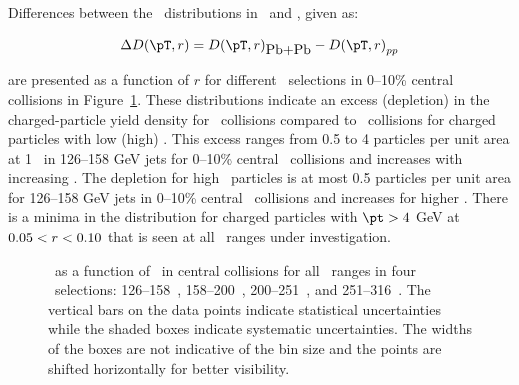 Differences between the \Dptr\ distributions in \pbpb\ and \pp, given as:

\begin{align}
\DeltaDptr = \Dptr_{\pbpb} - \Dptr_{pp}
\end{align}

are presented as a function of $r$ for different \pt\ selections in 0--10\% central collisions in Figure~\ref{fig:deltadptr}. 
These distributions indicate an excess (depletion) in the charged-particle yield density for \pbpb\ collisions compared to \pp\ collisions for charged particles with low (high) \pt. This excess ranges from 0.5 to 4 particles per unit area at 1 \GeV\ in 126--158 GeV jets for 0--10\% central \pbpb\ collisions and increases with increasing \ptjet. The depletion for high \pt\ particles is at most 0.5 particles per unit area for 126--158 GeV jets in  0--10\% central \pbpb\ collisions and increases for higher \ptjet. There is a minima in the \DeltaDptr distribution for charged particles with \mbox{$\pt >  4$} GeV at $0.05 < \mbox{$r$} < 0.10$ that is seen at all \ptjet\ ranges under investigation.

\begin{figure}
   \caption{\DeltaDptr\ as a function of \rvar\ in central collisions for all \pt\ ranges in four \ptjet\ selections: 126--158~\GeV, 158--200~\GeV, 200--251~\GeV, and 251--316~\GeV. The vertical bars on the data points indicate statistical uncertainties while the shaded boxes indicate systematic uncertainties. The widths of the boxes are not indicative of the bin size and the points are shifted horizontally for better visibility. }
      \label{fig:deltadptr}
\end{figure}

